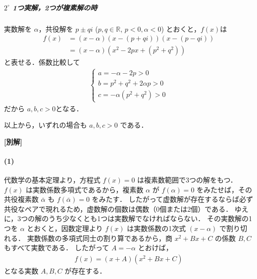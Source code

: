 \documentclass[../../main.tex]{subfiles}
\begin{document}
\subparagraph{$2^\circ$ 1つ実解，2つが複素解の時}

実数解を $\alpha$，共役解を $p \pm qi$ ($p, q \in \mathbb{R}$, $p < 0, \alpha < 0$) とおくと，$f(x)$は
\begin{align}
  f(x) &= (x-\alpha)(x-(p+qi))(x-(p-qi)) \\
  &= (x-\alpha)(x^2 - 2px + (p^2+q^2))
\end{align}
と表せる．係数比較して
\begin{align}
  \begin{cases}
    a = -\alpha - 2p  > 0 \\
    b = p^2+q^2+2\alpha p  > 0 \\
    c = -\alpha(p^2+q^2)  > 0
  \end{cases}
\end{align}
だから $a, b, c > 0$となる．
\casesend

以上から，いずれの場合も $a, b, c > 0$ である．

{\bf [別解]}

\paragraph{(1)}

代数学の基本定理より，方程式 $f(x)=0$ は複素数範囲で3つの解をもつ．
$f(x)$ は実数係数多項式であるから，複素数 $\alpha$ が $f(\alpha)=0$ をみたせば，その共役複素数 $\bar{\alpha}$ も $f(\bar{\alpha})=0$ をみたす．
したがって虚数解が存在するならば必ず共役なペアで現れるため，虚数解の個数は偶数（0個または2個）である．
ゆえに，3つの解のうち少なくとも1つは実数解でなければならない．
その実数解の1つを $\alpha$ とおくと，因数定理より $f(x)$ は実数係数の1次式 $(x-\alpha)$ で割り切れる．
実数係数の多項式同士の割り算であるから，商 $x^2+Bx+C$ の係数 $B, C$ もすべて実数である．
したがって $A = -\alpha$ とおけば，
\begin{align}
  f(x) = (x+A)(x^2+Bx+C)
\end{align}
となる実数 $A, B, C$ が存在する．

\newpage
\end{document}
